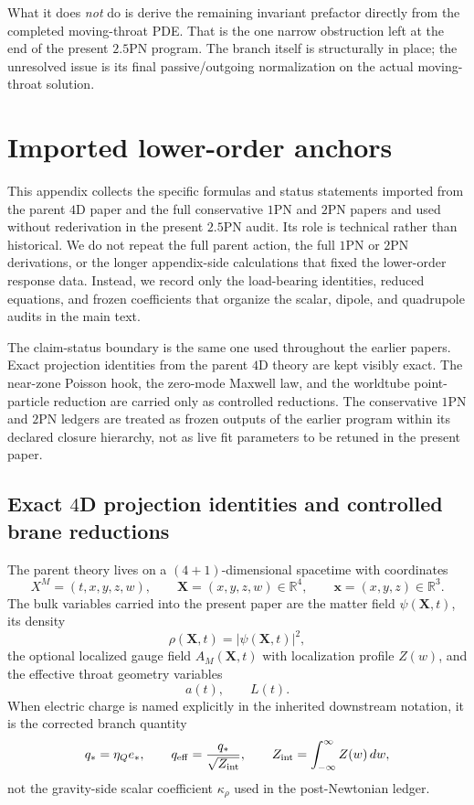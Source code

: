 \documentclass[11pt]{article}
\begin{document}
What it does \emph{not} do is derive the remaining invariant prefactor directly
from the completed moving-throat PDE.  That is the one narrow obstruction left
at the end of the present $2.5$PN program.  The branch itself is structurally in
place; the unresolved issue is its final passive/outgoing normalization on the
actual moving-throat solution.

\section{Imported lower-order anchors}
\label{app:imported-lower-order-anchors}

This appendix collects the specific formulas and status statements imported from the
parent $4$D paper and the full conservative $1$PN and $2$PN papers and used without
rederivation in the present $2.5$PN audit.  Its role is technical rather than historical.
We do not repeat the full parent action, the full $1$PN or $2$PN derivations, or the
longer appendix-side calculations that fixed the lower-order response data.  Instead, we
record only the load-bearing identities, reduced equations, and frozen coefficients that
organize the scalar, dipole, and quadrupole audits in the main text.

The claim-status boundary is the same one used throughout the earlier papers.  Exact
projection identities from the parent $4$D theory are kept visibly exact.  The
near-zone Poisson hook, the zero-mode Maxwell law, and the worldtube point-particle
reduction are carried only as controlled reductions.  The conservative $1$PN and $2$PN
ledgers are treated as frozen outputs of the earlier program within its declared closure
hierarchy, not as live fit parameters to be retuned in the present paper.

\subsection{Exact \texorpdfstring{$4$}{4}D projection identities and controlled brane reductions}
\label{app:imported-lower-order-anchors-4d}

The parent theory lives on a $(4+1)$-dimensional spacetime with coordinates
\[
X^M=(t,x,y,z,w),
\qquad
\mathbf{X}=(x,y,z,w)\in\mathbb R^4,
\qquad
\mathbf{x}=(x,y,z)\in\mathbb R^3.
\]
The bulk variables carried into the present paper are the matter field
$\psi(\mathbf{X},t)$, its density
\[
\rho(\mathbf{X},t)=|\psi(\mathbf{X},t)|^2,
\]
the optional localized gauge field $A_M(\mathbf{X},t)$ with localization profile
$Z(w)$, and the effective throat geometry variables
\[
a(t),\qquad L(t).
\]
When electric charge is named explicitly in the inherited downstream notation, it is the
corrected branch quantity
\[
q_* = \eta_Q e_*,
\qquad
q_{\rm eff}=\frac{q_*}{\sqrt{Z_{\rm int}}},
\qquad
Z_{\rm int}=\int_{-\infty}^{\infty} Z(w)\,dw,
\]
not the gravity-side scalar coefficient $\kappa_\rho$ used in the post-Newtonian ledger.
\end{document}
